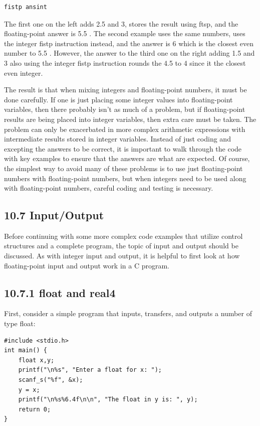 \documentclass[10pt]{article}
\begin{document}
\begin{verbatim}
fistp ansint
\end{verbatim}

The first one on the left adds 2.5 and 3, stores the result using ftsp, and the floating-point answer is 5.5 . The second example uses the same numbers, uses the integer fistp instruction instead, and the answer is 6 which is the closest even number to 5.5 . However, the answer to the third one on the right adding 1.5 and 3 also using the integer fistp instruction rounds the 4.5 to 4 since it the closest even integer.

The result is that when mixing integers and floating-point numbers, it must be done carefully. If one is just placing some integer values into floating-point variables, then there probably isn't as much of a problem, but if floating-point results are being placed into integer variables, then extra care must be taken. The problem can only be exacerbated in more complex arithmetic expressions with intermediate results stored in integer variables. Instead of just coding and excepting the answers to be correct, it is important to walk through the code with key examples to ensure that the answers are what are expected. Of course, the simplest way to avoid many of these problems is to use just floating-point numbers with floating-point numbers, but when integers need to be used along with floating-point numbers, careful coding and testing is necessary.

\subsection*{10.7 Input/Output}
Before continuing with some more complex code examples that utilize control structures and a complete program, the topic of input and output should be discussed. As with integer input and output, it is helpful to first look at how floating-point input and output work in a C program.

\subsection*{10.7.1 float and real4}
First, consider a simple program that inputs, transfers, and outputs a number of type float:

\begin{verbatim}
#include <stdio.h>
int main() {
    float x,y;
    printf("\n%s", "Enter a float for x: ");
    scanf_s("%f", &x);
    y = x;
    printf("\n%s%6.4f\n\n", "The float in y is: ", y);
    return 0;
}
\end{verbatim}
\end{document}
